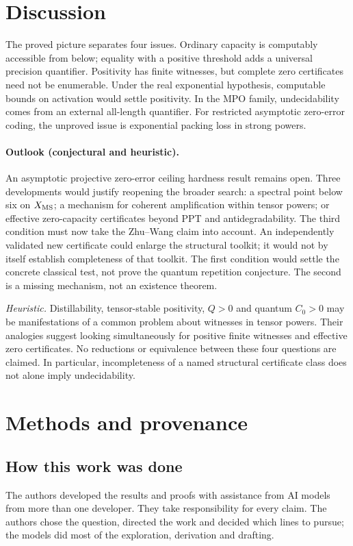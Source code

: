 \section{Discussion}\label{sec:discussion}
The proved picture separates four issues. Ordinary capacity is
computably accessible from below; equality with a positive threshold
adds a universal precision quantifier. Positivity has finite witnesses,
but complete zero certificates need not be enumerable. Under the real
exponential hypothesis, computable bounds on activation would settle
positivity. In the MPO family, undecidability comes from an external
all-length quantifier. For restricted asymptotic zero-error coding, the
unproved issue is exponential packing loss in strong powers.

\paragraph{Outlook (conjectural and heuristic).}
An asymptotic projective zero-error ceiling hardness result remains open. Three developments would justify reopening the broader
search: a spectral point below six on $X_{\rm MS}$; a mechanism for
coherent amplification within tensor powers; or effective zero-capacity
certificates beyond PPT and antidegradability. The third condition must
now take the Zhu--Wang claim into account. An independently validated
new certificate could enlarge the structural toolkit; it would not by
itself establish completeness of that toolkit. The first condition
would settle the concrete classical test, not prove the quantum
repetition conjecture. The second is a missing mechanism, not an
existence theorem.

\emph{Heuristic.} Distillability, tensor-stable positivity, $Q>0$ and
quantum $C_0>0$ may be manifestations of a common problem about witnesses
in tensor powers. Their analogies suggest looking simultaneously for
positive finite witnesses and effective zero certificates. No reductions
or equivalence between these four questions are claimed. In particular,
incompleteness of a named structural certificate class does not alone
imply undecidability.

\section{Methods and provenance}\label{sec:methods}
\subsection*{How this work was done}
The authors developed the results and proofs with assistance from AI
models from more than one developer. They take responsibility for every
claim. The authors chose the question, directed the work and decided
which lines to pursue; the models did most of the exploration,
derivation and drafting.

